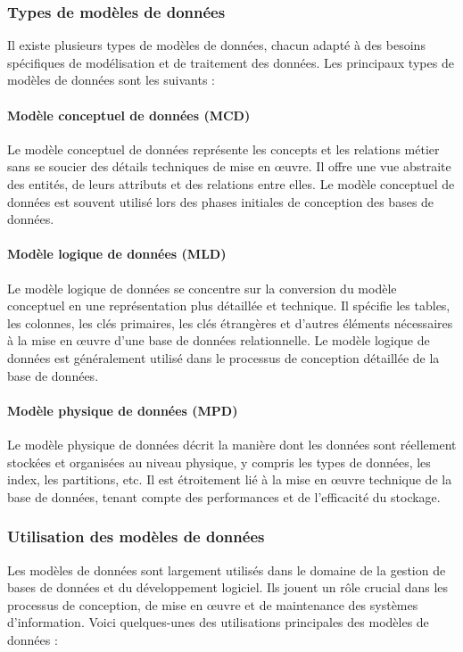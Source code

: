 \documentclass{article}
\begin{document}
	\subsubsection{Types de modèles de données}
	Il existe plusieurs types de modèles de données, chacun adapté à des besoins spécifiques de modélisation et de traitement des données. Les principaux types de modèles de données sont les suivants :
	
	\paragraph{Modèle conceptuel de données (MCD)}
	Le modèle conceptuel de données représente les concepts et les relations métier sans se soucier des détails techniques de mise en œuvre. Il offre une vue abstraite des entités, de leurs attributs et des relations entre elles. Le modèle conceptuel de données est souvent utilisé lors des phases initiales de conception des bases de données.
	
	\paragraph{Modèle logique de données (MLD)}
	Le modèle logique de données se concentre sur la conversion du modèle conceptuel en une représentation plus détaillée et technique. Il spécifie les tables, les colonnes, les clés primaires, les clés étrangères et d’autres éléments nécessaires à la mise en œuvre d’une base de données relationnelle. Le modèle logique de données est généralement utilisé dans le processus de conception détaillée de la base de données.
	
	\paragraph{Modèle physique de données (MPD)}
	Le modèle physique de données décrit la manière dont les données sont réellement stockées et organisées au niveau physique, y compris les types de données, les index, les partitions, etc. Il est étroitement lié à la mise en œuvre technique de la base de données, tenant compte des performances et de l’efficacité du stockage.
	
	\subsubsection{Utilisation des modèles de données}
	Les modèles de données sont largement utilisés dans le domaine de la gestion de bases de données et du développement logiciel. Ils jouent un rôle crucial dans les processus de conception, de mise en œuvre et de maintenance des systèmes d’information. Voici quelques-unes des utilisations principales des modèles de données :
	
\end{document}
